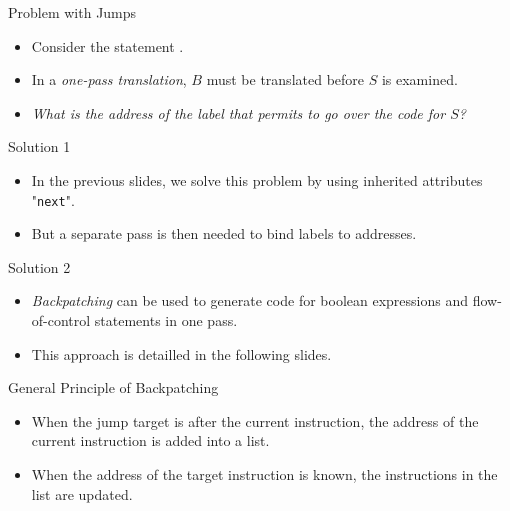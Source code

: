 \begin{bibunit}[apalike]
\begin{frame}[allowframebreaks]{Problem with Jumps}
	\vspace{1em}
	\begin{example}
		\begin{itemize}
		\item Consider the statement .
		\item In a \emph{one-pass translation}, $B$ must be translated before $S$ is examined.
		\item \emph{What is the address of the label that permits to go over the code for $S$?}
		\end{itemize}
	\end{example}
	\framebreak
	\begin{block}{Solution 1}
		\begin{itemize}
		\item In the previous slides, we solve this problem by using inherited attributes "\texttt{next}".
		\item \alert{But a separate pass is then needed to bind labels to addresses.}
		\end{itemize}
	\end{block}
	\vspace{1em}
	\begin{block}{Solution 2}
		\begin{itemize}
		\item \emph{Backpatching} can be used to generate code for boolean expressions and flow-of-control statements in one pass.
		\item This approach is detailled in the following slides.
		\end{itemize}
	\end{block}
\end{frame}

\begin{frame}{General Principle of Backpatching}
	\begin{itemize}
	\item When the jump target is after the current instruction, the address of the current instruction is added into a list.
	\vspace{2em}
	\item When the address of the target instruction is known, the instructions in the list are updated.
	\end{itemize}
\end{frame}


\end{bibunit}
